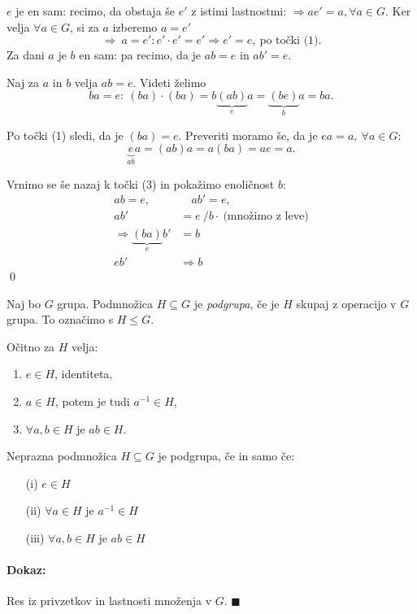  $e$ je en sam: recimo, da obstaja \v se $e'$ z istimi lastnostmi: $\Rightarrow a e' = a, \forall a\in G$.
Ker velja $\forall a \in G$, si za $a$ izberemo $a = e'$
\[
\Rightarrow\ a = e': e'\cdot e' = e' \Rightarrow e' = e,\ \text{po to\v cki (1).}
\]
Za dani $a$ je $b$ en sam: pa recimo, da je $ab = e$ in $ab' = e$.

 Naj za $a$ in $b$ velja $ab = e$. Videti \v zelimo
\[
ba = e:\ (ba)\cdot (ba) = b \underbrace{(ab)}_e a = \underbrace{(be)}_b a =b a.
\]

Po to\v cki (1) sledi, da je $(ba) = e$. Preveriti moramo \v se, da je $ea = a,\ \forall a\in G$:
\[
	\underbrace{e}_{ab} a = (ab)a= a(ba) = ae = a.
\] 

 Vrnimo se \v se nazaj k to\v cki (3) in poka\v zimo enoli\v cnost $b$:
\begin{align*}
	ab = e, &\quad ab' = e,\\
	ab' &= e\ / b\cdot\ \text{(mno\v zimo z leve)}\\
	\Rightarrow \underbrace{(ba)}_e b' &= b\\
	eb' &\Rightarrow b
\end{align*}
\qed

\begin{defin}
	Naj bo $G$ grupa. Podmno\v zica $H \subseteq G$ je \emph{podgrupa}, \v ce je $H$ skupaj z operacijo v $G$
	grupa. To ozna\v cimo s $H \leq G$.
\end{defin}

O\v citno za $H$ velja:

\begin{enumerate}
	\item{$e \in H$, identiteta,}
	\item{$a \in H$, potem je tudi $a^{-1} \in H$,}
	\item{$\forall a,b \in H$ je $ab \in H$.}
\end{enumerate}

\begin{trditev}
	Neprazna podmno\v zica $H \subseteq G$ je podgrupa, \v ce in samo \v ce:
	\begin{itemize}
		\item[(i)]{$e \in H$}
		\item[(ii)]{$\forall a \in H$ je $a^{-1} \in H$}
		\item[(iii)]{$\forall a,b \in H$ je $ab \in H$}
	\end{itemize}
\end{trditev}

\paragraph{Dokaz:} Res iz privzetkov in lastnosti mno\v zenja v $G$. $\blacksquare$

